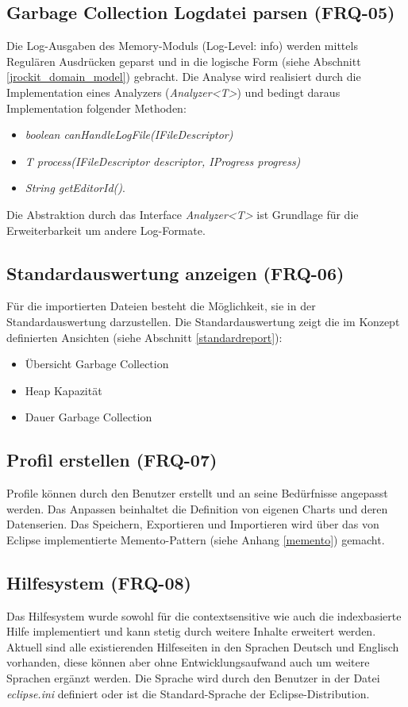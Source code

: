 \subsection{Garbage Collection Logdatei parsen (FRQ-05)}
Die Log-Ausgaben des Memory-Moduls (Log-Level: info) werden mittels Regulären Ausdrücken geparst und in die logische Form (siehe Abschnitt \ref{jrockit_domain_model}) gebracht. Die Analyse wird realisiert durch die Implementation eines Analyzers (\textit{Analyzer\textless T\textgreater}) und bedingt daraus Implementation folgender Methoden:
\begin{itemize}
\item \textit{boolean canHandleLogFile(IFileDescriptor)}
\item \textit{T process(IFileDescriptor descriptor, IProgress progress)}
\item \textit{String getEditorId()}.
\end{itemize}
Die Abstraktion durch das Interface \textit{Analyzer\textless T\textgreater} ist Grundlage für die Erweiterbarkeit um andere Log-Formate.

\subsection{Standardauswertung anzeigen (FRQ-06)}
Für die importierten Dateien besteht die Möglichkeit, sie in der Standardauswertung darzustellen. Die Standardauswertung zeigt die im Konzept definierten Ansichten (siehe Abschnitt \ref{standardreport}):
\begin{itemize}
\item Übersicht Garbage Collection
\item Heap Kapazität
\item Dauer Garbage Collection
\end{itemize}

\subsection{Profil erstellen (FRQ-07)}
Profile können durch den Benutzer erstellt und an seine Bedürfnisse angepasst werden. Das Anpassen beinhaltet die Definition von eigenen Charts und deren Datenserien. Das Speichern, Exportieren und Importieren wird über das von Eclipse implementierte Memento-Pattern (siehe Anhang \ref{memento}) gemacht.

\subsection{Hilfesystem (FRQ-08)}
Das Hilfesystem wurde sowohl für die contextsensitive wie auch die indexbasierte Hilfe implementiert und kann stetig durch weitere Inhalte erweitert werden. Aktuell sind alle existierenden Hilfeseiten in den Sprachen Deutsch und Englisch vorhanden, diese können aber ohne Entwicklungsaufwand auch um weitere Sprachen ergänzt werden. Die Sprache wird durch den Benutzer in der Datei \textit{eclipse.ini} definiert oder ist die Standard-Sprache der Eclipse-Distribution.


